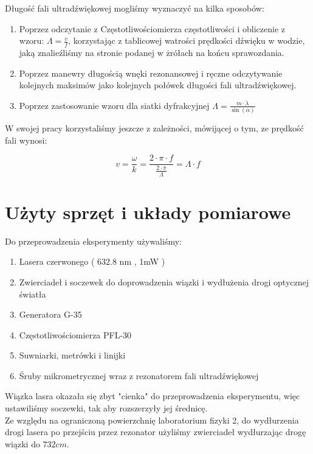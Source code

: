 \documentclass[a4paper,12pt]{article}
\begin{document}
Długość fali ultradźwiękowej mogliśmy wyznaczyć na kilka sposobów:
\begin{enumerate}
  \item Poprzez odczytanie z Częstotliwościomierza częstotliwości i obliczenie z wzoru: $\Lambda=\frac{v}{f}$, korzystając z tablicowej watrości prędkości dźwięku w wodzie, jaką znalieźliśmy na stronie podanej w żrółach na końcu sprawozdania. 
  \item Poprzez manewry długością wnęki rezonansowej i ręczne odczytywanie kolejnych maksimów jako kolejnych połówek długości fali ultradźwiękowej.
  \item Poprzez zastosowanie wzoru dla siatki dyfrakcyjnej $\Lambda=\frac{m \cdot \lambda}{\sin (\alpha)}$
\end{enumerate}

W swojej pracy korzystaliśmy jeszcze z zależności, mówijącej o tym, ze prędkość fali wynosi: 

$$v = \frac{\omega}{k} = \frac{2\cdot \pi \cdot f }{\frac{2\cdot \pi}{\Lambda} }= \Lambda \cdot f $$


\section{Użyty sprzęt i układy pomiarowe}



Do przeprowadzenia eksperymenty używaliśmy: 

\begin{enumerate}
  \item Lasera czerwonego ( 632.8 nm , 1mW ) 
  \item Zwierciadeł i soczewek do doprowadzenia wiązki i wydłużenia drogi optycznej światła
  \item Generatora G-35
  \item Częstotliwościomierza PFL-30
  \item Suwniarki, metrówki i linijki  
  \item Śruby mikrometrycznej wraz z rezonatorem fali ultradźwiękowej
\end{enumerate}

Wiązka lasra okazała się zbyt "cienka" do przeprowadzenia eksperymentu, więc ustawiliśmy soczewki, tak aby rozszerzyły jej średnicę. \\
Ze względu na ograniczoną powierzchnię laboratorium fizyki 2, do wydłurzenia drogi lasera po przejściu przez rezonator użyliśmy zwierciadeł wydłurzając drogę wiązki do $732cm$. 
\end{document}
